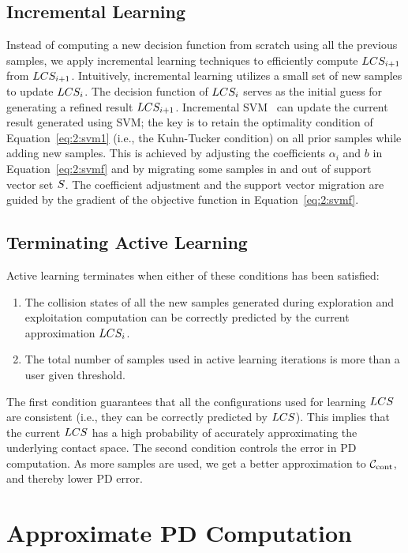 \subsection{Incremental Learning}
\label{sec:2:incremental_learning}
Instead of computing a new decision function
from scratch using all the previous samples, we apply incremental
learning techniques to efficiently compute $LCS_{i+1}$ from
$LCS_{i+1}$. Intuitively, incremental learning utilizes a small set
of new samples to update $LCS_i$. The decision function of $LCS_i$
serves as the initial guess for generating a refined result
$LCS_{i+1}$. Incremental SVM~\cite{Karasuyama:2009:MID} can update
the current result generated using SVM; the key is to retain the optimality condition of Equation~\ref{eq:2:svm1} (i.e., the Kuhn-Tucker condition) on all prior samples while adding new samples. This is achieved by adjusting the coefficients $\alpha_i$ and $b$ in Equation~\ref{eq:2:svmf} and by migrating some samples
in and out of support vector set $S$. The coefficient adjustment and the support vector migration are guided by the gradient of the objective function in Equation~\ref{eq:2:svmf}.

\subsection{Terminating Active Learning}
Active learning terminates when either of these conditions has been satisfied:
\begin{enumerate}
    \item The collision states of all the new samples generated during
exploration and exploitation computation can be correctly predicted by the
current approximation $LCS_i$.
    \item The total number of samples used in active learning iterations is more than a user given threshold.
   \end{enumerate}
The first condition guarantees that all the configurations used for learning $LCS$ are consistent (i.e., they can be correctly predicted by $LCS$). This implies that the current $LCS$ has a high probability of accurately approximating the underlying contact space.
The second condition controls the error in PD computation. As more samples are used, we get a better approximation to $\mathcal C_\text{cont}$, and thereby lower PD error.


\section{Approximate PD Computation}
\label{sec:2:approxPD}

